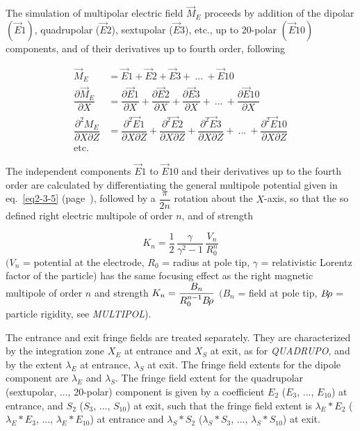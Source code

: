 {The simulation of multipolar electric  field $ \vec  M_E $ proceeds by addition of 
the dipolar $ (\vec  E1) $,  quadrupolar ($ \vec  E2 $), sextupolar ($ \vec  E3 $), 
etc.,  up to 20-polar $ (\vec  E10) $ components, and of their derivatives up to fourth 
order, following

\begin{align*}
	\vec  M_E & = \vec  E1 + \vec  E2 + \vec  E3 + ~...~ + \vec  E10 \\
	\dfrac{ \partial\vec  M_E }{ \partial X}  
	          & =  \dfrac{ \partial\vec  E1 }{ \partial X} +
	               \dfrac{\partial\vec  E2 }{ \partial X} + 
	               \dfrac{\partial\vec  E3 }{ \partial X} +
	                         ~...~ +
	               \dfrac{\partial\vec  E10 }{ \partial X}  \\
	\dfrac{ \partial^ 2M_E}{ \partial X\partial Z} 
	          &   = \dfrac{\partial^ 2\vec  E1 }{ \partial X\partial Z} +
	               \dfrac{\partial^ 2\vec  E2 }{\partial X\partial Z} + 
	               \dfrac{\partial^ 2\vec  E3 }{ \partial X\partial Z} +
                                 ~...~ +
	               \dfrac{\partial^ 2\vec  E10 }{ \partial X\partial Z}  \\
	   \text{etc.} &
\end{align*}

\noindent The independent components $ \vec  E1 $ to $ \vec  E10 $ and their
derivatives up to the fourth  order are calculated by differentiating the general multipole potential 
 given  in eq.~\ref{eq2-3-5} (page~\pageref{eq2-3-5}), followed by 
  a $ \dfrac{\pi }{ 2n} $ rotation about the $ X$-axis, so
that the so defined right electric multipole of order $ n$,  and of 
strength~\cite{Biblio14, Biblio15}   %

$$ K_n = \dfrac{1 }{ 2}\, \dfrac{\gamma }{ \gamma^ 2-1}\, \dfrac{V_ n }{ R^n_0} $$
%
$ (V_ n $ = potential at the electrode, $ R_0 $ = radius at pole tip, 
$\gamma$  = relativistic Lorentz factor of the particle) has the same focusing effect 
 as  the right magnetic multipole of order $ n $ and strength
 $ K_n= \dfrac{B_n }{ R^{n-1}_0 B\!\rho} $ 
$ (B_n $ = field at pole tip, $ B\!\rho $ = particle rigidity, see \textsl{MULTIPOL}). 


\medskip

\noindent The entrance and exit fringe fields are treated separately.  They
are characterized by the integration zone $ X_E $ at entrance and $ X_S $ at exit,
as for \textsl{QUADRUPO}, and by the extent $ \lambda_ E $ at entrance, $\lambda_ S $ 
at exit. The fringe field extents for the dipole component are $ \lambda_ E $
and $ \lambda_ S $. The fringe field extent for the quadrupolar (sextupolar,  ..., 
 20-polar) component is given by a coefficient $ E_2 $ 
 ($E_3$, ..., $E_{10}$)   at entrance, and $ S_2 $ ($ S_3$, ..., $S_{10}$)   at exit, 
 such that the fringe field extent is $ \lambda_ E\ast E_2$  
 ($\lambda_ E\ast E_3$, ..., $\lambda_ E\ast E_{10}$)  at 
entrance and $ \lambda_ S\ast S_2 $  ($\lambda_ S\ast S_3$, ..., $\lambda_ S\ast S_{10}$) 
 at exit.  
\medskip

}
